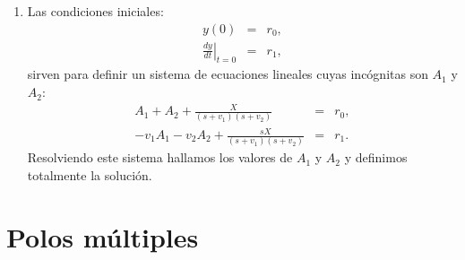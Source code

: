 \begin{enumerate}
	\item Las condiciones iniciales: 
	\begin{eqnarray}
		y(0) &=& r_{0}, \\
		\left. \frac{dy}{dt} \right|_{t = 0} &=& r_{1},      
	\end{eqnarray}
	sirven para definir un sistema de ecuaciones lineales cuyas inc\'{o}gnitas son $A_{1}$ y $A_{2}$:
	\begin{eqnarray}
		A_{1} + A_{2} + \frac{X}{(s + v_{1})(s + v_{2})}  &=& r_{0},   \\
		-v_{1} A_{1} - v_{2} A_{2} + \frac{s X}{(s + v_{1})(s + v_{2})} &=& r_{1}.
	\end{eqnarray}
	Resolviendo este sistema hallamos los valores de $A_{1}$ y $A_{2}$ y definimos totalmente la soluci\'{o}n.
\end{enumerate}

\section{Polos m\'{u}ltiples}


